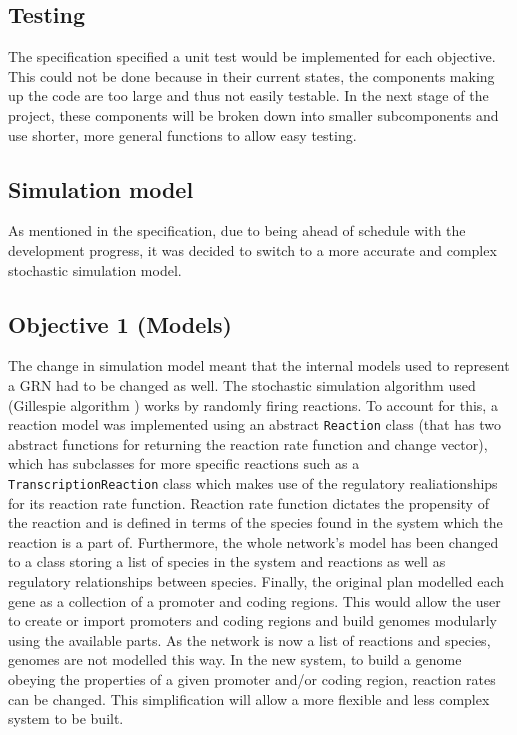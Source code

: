 \documentclass{article}
\begin{document}
	\subsection{Testing} \label{progress-testing}
	The specification specified a unit test would be implemented for each objective. This could not be done because in their current states, the components making up the code are too large and thus not easily testable. In the next stage of the project, these components will be broken down into smaller subcomponents and use shorter, more general functions to allow easy testing.
	
	
	\subsection{Simulation model} \label{sim-model}
	As mentioned in the specification, due to being ahead of schedule with the development progress, it was decided to switch to a more accurate and complex stochastic simulation model. 
	
	\subsection{Objective 1 (Models)}  
	The change in simulation model meant that the internal models used to represent a GRN had to be changed as well. The stochastic simulation algorithm used (Gillespie algorithm \cite{gillespie_original}) works by randomly firing reactions. To account for this, a reaction model was implemented using an abstract \verb|Reaction| class (that has two abstract functions for returning the reaction rate function and change vector), which has subclasses for more specific reactions such as a \verb|TranscriptionReaction| class which makes use of the regulatory realiationships for its reaction rate function. Reaction rate function dictates the propensity of the reaction and is defined in terms of the species found in the system which the reaction is a part of. Furthermore, the whole network's model has been changed to a class storing a list of species in the system and reactions as well as regulatory relationships between species. Finally, the original plan modelled each gene as a collection of a promoter and coding regions. This would allow the user to create or import promoters and coding regions and build genomes modularly using the available parts. As the network is now a list of reactions and species, genomes are not modelled this way. In the new system, to build a genome obeying the properties of a given promoter and/or coding region, reaction rates can be changed. This simplification will allow a more flexible and less complex system to be built.
	
\end{document}
